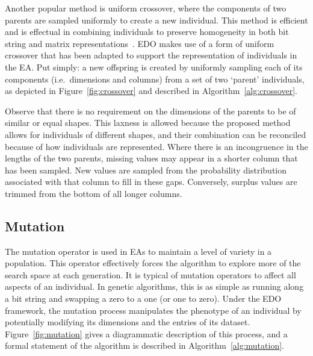 Another popular method is uniform crossover, where the components of two parents
are sampled uniformly to create a new individual. This method is efficient and
is effectual in combining individuals to preserve homogeneity in both bit string
and matrix representations~\cite{Chen2018,Semenkin2012}. EDO makes use of a form
of uniform crossover that has been adapted to support the representation of
individuals in the EA. Put simply: a new offspring is created by uniformly
sampling each of its components (i.e.\ dimensions and columns) from a set of two
`parent' individuals, as depicted in Figure~\ref{fig:crossover} and described in
Algorithm~\ref{alg:crossover}.


Observe that there is no requirement on the dimensions of the parents to be of
similar or equal shapes. This laxness is allowed because the proposed method
allows for individuals of different shapes, and their combination can be
reconciled because of how individuals are represented. Where there is an
incongruence in the lengths of the two parents, missing values may appear in a
shorter column that has been sampled. New values are sampled from the
probability distribution associated with that column to fill in these gaps.
Conversely, surplus values are trimmed from the bottom of all longer columns.



\subsection{Mutation}\label{subsection:mutation}

The mutation operator is used in EAs to maintain a level of variety in a
population. This operator effectively forces the algorithm to explore more of
the search space at each generation. It is typical of mutation operators to
affect all aspects of an individual. In genetic algorithms, this is as simple as
running along a bit string and swapping a zero to a one (or one to zero). Under
the EDO framework, the mutation process manipulates the phenotype of an
individual by potentially modifying its dimensions and the entries of its
dataset. Figure~\ref{fig:mutation} gives a diagrammatic description of this
process, and a formal statement of the algorithm is described in
Algorithm~\ref{alg:mutation}.

